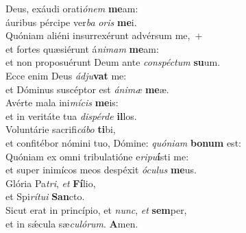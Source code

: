\evenverse Deus, exáudi orati\textit{ó}\textit{nem} \textbf{me}am:~\*\\
\evenverse áuribus pércipe ver\textit{ba} \textit{o}\textit{ris} \textbf{me}i.\\
\oddverse Quóniam aliéni insurrexérunt advérsum me,~+\\
\oddverse  et fortes quæsiérunt á\textit{ni}\textit{mam} \textbf{me}am:~\*\\
\oddverse et non proposuérunt Deum ante \textit{con}\textit{spé}\textit{ctum} \textbf{su}um.\\
\evenverse Ecce enim Deus \textit{ád}\textit{ju}\textbf{vat} me:~\*\\
\evenverse et Dóminus suscéptor est \textit{á}\textit{ni}\textit{mæ} \textbf{me}æ.\\
\oddverse Avérte mala ini\textit{mí}\textit{cis} \textbf{me}is:~\*\\
\oddverse et in veritáte tua \textit{di}\textit{spér}\textit{de} \textbf{il}los.\\
\evenverse Voluntárie sacrifi\textit{cá}\textit{bo} \textbf{ti}bi,~\*\\
\evenverse et confitébor nómini tuo, Dómine: \textit{quó}\textit{ni}\textit{am} \textbf{bo}\textbf{num} est:\\
\oddverse Quóniam ex omni tribulatióne e\textit{ri}\textit{pu}\textbf{í}sti me:~\*\\
\oddverse et super inimícos meos despéxit \textit{ó}\textit{cu}\textit{lus} \textbf{me}us.\\
\evenverse Glória Pa\textit{tri}, \textit{et} \textbf{Fí}lio,~\*\\
\evenverse et Spi\textit{rí}\textit{tu}\textit{i} \textbf{San}cto.\\
\oddverse Sicut erat in princípio, et \textit{nunc}, \textit{et} \textbf{sem}per,~\*\\
\oddverse et in sǽcula sæ\textit{cu}\textit{ló}\textit{rum}. \textbf{A}men.\\
